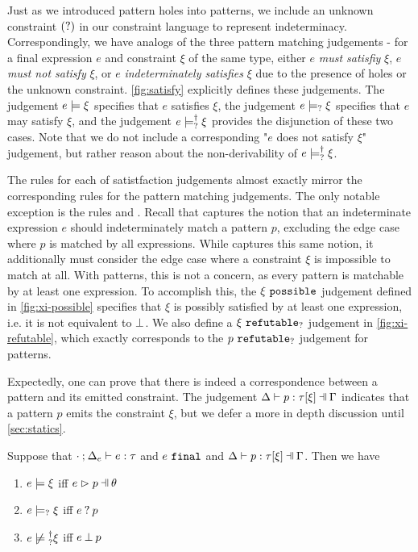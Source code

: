 Just as we introduced pattern holes into patterns, we include an unknown constraint $(\mathtt{?})$ in our constraint language to represent indeterminacy. Correspondingly, we have analogs of the three pattern matching judgements - for a final expression $e$ and constraint $\xi$ of the same type, either $e$ \emph{must satisfiy} $\xi$, $e$ \emph{must not satisfy} $\xi$, or $e$ \emph{indeterminately satisfies} $\xi$ due to the presence of holes or the unknown constraint. \autoref{fig:satisfy} explicitly defines these judgements. The judgement $e \models \xi$ specifies that $e$ satisfies $\xi$, the judgement $e \models_{?} \xi$ specifies that $e$ may satisfy $\xi$, and the judgement $e \models_{?}^{\dag} \xi$ provides the disjunction of these two cases. Note that we do not include a corresponding "$e$ does not satisfy $\xi$" judgement, but rather reason about the non-derivability of $e \models_{?}^{\dag} \xi$.

The rules for each of satistfaction judgements almost exactly mirror the corresponding rules for the pattern matching judgements. The only notable exception is the rules \MMNotIntro and \CMSNotIntro. Recall that \MMNotIntro captures the notion that an indeterminate expression $e$ should indeterminately match a pattern $p$, excluding the edge case where $p$ is matched by all expressions. While \CMSNotIntro captures this same notion, it additionally must consider the edge case where a constraint $\xi$ is impossible to match at all. With patterns, this is not a concern, as every pattern is matchable by at least one expression. To accomplish this, the $\xi ~\mathtt{possible}$ judgement defined in \autoref{fig:xi-possible} specifies that $\xi$ is possibly satisfied by at least one expression, i.e. it is not equivalent to $\bot$. We also define a $\xi ~\mathtt{refutable}_?$ judgement in \autoref{fig:xi-refutable}, which exactly corresponds to the $p ~\mathtt{refutable}_?$ judgement for patterns. 




Expectedly, one can prove that there is indeed a correspondence between a pattern and its emitted constraint. The judgement $\chpattyp{p}{\tau}{\xi}{\Gamma}{\Delta}$ indicates that a pattern $p$ emits the constraint $\xi$, but we defer a more in depth discussion until \autoref{sec:statics}.

\begin{lemma}
	\label{lemma:const-matching-coherence}
	Suppose that $\cdot \mathbin{;} \Delta_e \vdash e : \tau$ and $e ~\mathtt{final}$ and $\chpattyp{p}{\tau}{\xi}{\Gamma}{\Delta}$. Then we have
	\begin{enumerate}
		\item $e \models \xi$ iff $\hpatmatch{e}{p}{\theta}$
		\item $e \models_{?} \xi$ iff $e \mathbin{?} p$
		\item $\cnotsatisfyormay{e}{\xi}$ iff $e \mathbin{\bot} p$
	\end{enumerate}
\end{lemma}
 
